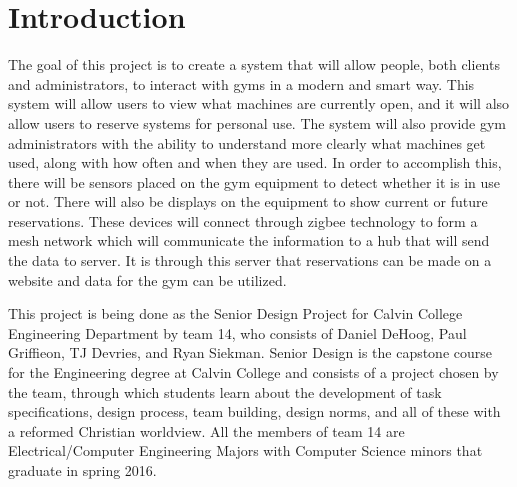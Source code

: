 \documentclass[ppfs.tex]{template/subfiles}
\begin{document}
\section{Introduction}

The goal of this project is to create a system that will allow people, both clients and administrators, to interact with gyms in a modern and smart way. This system will allow users to view what machines are currently open, and it will also allow users to reserve systems for personal use. The system will also provide gym administrators with the ability to understand more clearly what machines get used, along with how often and when they are used. In order to accomplish this, there will be sensors placed on the gym equipment to detect whether it is in use or not. There will also be displays on the equipment to show current or future reservations. These devices will connect through zigbee technology to form a mesh network which will communicate the information to a hub that will send the data to server. It is through this server that reservations can be made on a website and data for the gym can be utilized. 

This project is being done as the Senior Design Project for Calvin College Engineering Department by team 14, who consists of Daniel DeHoog, Paul Griffieon, TJ Devries, and Ryan Siekman. Senior Design is the capstone course for the Engineering degree at Calvin College and consists of a project chosen by the team, through which students learn about the development of task specifications, design process, team building, design norms, and all of these with a reformed Christian worldview. All the members of team 14 are Electrical/Computer Engineering Majors with Computer Science minors that graduate in spring 2016. 
\end{document}
